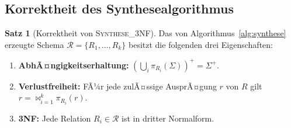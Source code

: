 ﻿\documentclass[a4paper,12pt]{report}
\theoremstyle{definition}
\newtheorem{theorem}{Satz}[chapter]
\theoremstyle{remark}
\begin{document}
\subsection{Korrektheit des Synthesealgorithmus}

\begin{theorem}[Korrektheit von \textsc{Synthese\_3NF}]
\label{thm:synthese-korrekt}
Das von Algorithmus~\ref{alg:synthese} erzeugte Schema
$\mathcal{R}=\{R_1,\ldots,R_k\}$ besitzt die folgenden drei
Eigenschaften:
\begin{enumerate}
  \item[(K1)] \textbf{AbhÃ¤ngigkeitserhaltung:} $(\bigcup_{i}
    \pi_{R_i}(\Sigma))^+ = \Sigma^+$.
  \item[(K2)] \textbf{Verlustfreiheit:} FÃ¼r jede zulÃ¤ssige AusprÃ¤gung
    $r$ von $R$ gilt $r = \Join_{i=1}^{k}\pi_{R_i}(r)$.
  \item[(K3)] \textbf{3NF:} Jede Relation $R_i\in\mathcal{R}$ ist in
    dritter Normalform.
\end{enumerate}
\end{theorem}
\end{document}
